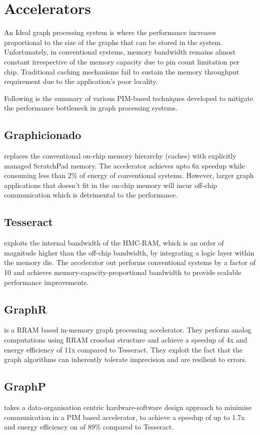 \section{Accelerators}
An Ideal graph processing system is where the performance increases proportional to the size of the graphs that can be stored in the system. Unfortunately, in conventional systems, memory bandwidth remains almost constant irrespective of the memory capacity due to pin count limitation per chip. Traditional caching mechanisms fail to sustain the memory throughput requirement due to the application's poor locality. 

Following is the summary of various PIM-based techniques developed to mitigate the performance bottleneck in graph processing systems. \par

 \subsection{Graphicionado} \cite{Graphicionado} replaces the conventional on-chip memory hierarchy (caches) with explicitly managed ScratchPad memory. The accelerator achieves upto 6x speedup while consuming less than 2\% of energy of conventional systems. However, larger graph applications that doesn't fit in the on-chip memory will incur off-chip communication which is detrimental to the performance.

 \subsection{Tesseract} \cite{Tesseract} exploits the internal bandwidth of the HMC-RAM, which is an order of magnitude higher than the off-chip bandwidth, by integrating a logic layer within the memory die. The accelerator out performs conventional systems by a factor of 10 and achieves memory-capacity-proportional bandwidth to provide scalable performance improvements.

 \subsection{GraphR} \cite{GraphR} is a RRAM based in-memory graph processing accelerator. They perform analog computations using RRAM crossbar structure and achieve a speedup of 4x and energy efficiency of 11x compared to Tesseract. They exploit the fact that the graph algorithms can inherently tolerate imprecision and are resilient to errors.
 
 \subsection{GraphP} \cite{GraphP} takes a data-organisation centric hardware-software design approach to minimise communication in a PIM based accelerator, to achieve a speedup of up to 1.7x and energy efficiency on of 89\% compared to Tesseract.
 
